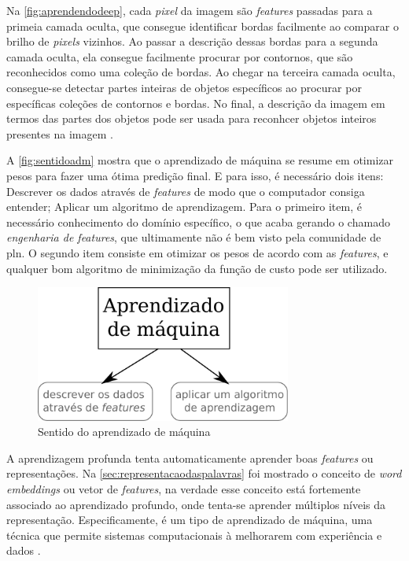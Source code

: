 Na \autoref{fig:aprendendodeep}, cada \textit{pixel} da imagem são \textit{features} passadas para a primeia camada oculta, que consegue identificar bordas facilmente ao comparar o brilho de \textit{pixels} vizinhos. Ao passar a descrição dessas bordas para a segunda camada oculta, ela consegue facilmente procurar por contornos, que são reconhecidos como uma coleção de bordas. Ao chegar na terceira camada oculta, consegue-se detectar partes inteiras de objetos específicos ao procurar por específicas coleções de contornos e bordas. No final, a descrição da imagem em termos das partes dos objetos pode ser usada para reconhcer objetos inteiros presentes na imagem \cite{Bengio-et-al-2015-Book}.


A \autoref{fig:sentidoadm} mostra que o aprendizado de máquina se resume em otimizar pesos para fazer uma ótima predição final. E para isso, é necessário dois itens: Descrever os dados através de \textit{features} de modo que o computador consiga entender; Aplicar um algoritmo de aprendizagem. Para o primeiro item, é necessário conhecimento do domínio específico, o que acaba gerando o chamado \textit{engenharia de features}, que ultimamente não é bem visto pela comunidade de \ac{pln}. O segundo item consiste em otimizar os pesos de acordo com as \textit{features}, e qualquer bom algoritmo de minimização da função de custo pode ser utilizado.

\begin{figure}
\centering
\caption{Sentido do aprendizado de máquina} \label{fig:sentidoadm}
\includegraphics[width=0.75\textwidth]{img/sentidoadm}
\end{figure}

A aprendizagem profunda tenta automaticamente aprender boas \textit{features} ou representações. Na \autoref{sec:representacaodaspalavras} foi mostrado o conceito de \textit{word embeddings} ou vetor de \textit{features}, na verdade esse conceito está fortemente associado ao aprendizado profundo, onde tenta-se aprender múltiplos níveis da representação. Especificamente, é um tipo de aprendizado de máquina, uma técnica que permite sistemas computacionais à melhorarem com experiência e dados \cite{Bengio-et-al-2015-Book}.

